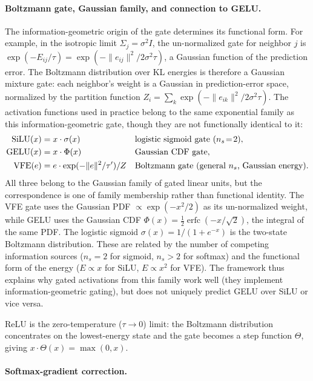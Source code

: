 \documentclass[twoside,11pt]{article}
\begin{document}
\paragraph{Boltzmann gate, Gaussian family, and connection to GELU.}

The information-geometric origin of the gate determines its functional form. For example, in the isotropic limit $\Sigma_j = \sigma^2 I$, the un-normalized gate for neighbor $j$ is $\exp(-E_{ij}/\tau) = \exp(-\|e_{ij}\|^2 / 2\sigma^2\tau)$, a Gaussian function of the prediction error. The Boltzmann distribution over KL energies is therefore a Gaussian mixture gate: each neighbor's weight is a Gaussian in prediction-error space, normalized by the partition function $Z_i = \sum_k \exp(-\|e_{ik}\|^2/2\sigma^2\tau)$. The activation functions used in practice belong to the same exponential family as this information-geometric gate, though they are not functionally identical to it:
%
\begin{align}
\text{SiLU}(x) &= x \cdot \sigma(x) && \text{logistic sigmoid gate ($n_s\!=\!2$)}, \notag \\
\text{GELU}(x) &= x \cdot \Phi(x) && \text{Gaussian CDF gate}, \label{eq:activation_comparison} \\
\text{VFE}(e) &= e \cdot \exp(-\|e\|^2/\tau')/Z && \text{Boltzmann gate (general $n_s$, Gaussian energy)}. \notag
\end{align}
%
All three belong to the Gaussian family of gated linear units, but the correspondence is one of family membership rather than functional identity. The VFE gate uses the Gaussian PDF $\propto \exp(-x^2/2)$ as its un-normalized weight, while GELU uses the Gaussian CDF $\Phi(x) = \frac{1}{2}\operatorname{erfc}(-x/\sqrt{2})$, the integral of the same PDF. The logistic sigmoid $\sigma(x) = 1/(1+e^{-x})$ is the two-state Boltzmann distribution. These are related by the number of competing information sources ($n_s = 2$ for sigmoid, $n_s > 2$ for softmax) and the functional form of the energy ($E \propto x$ for SiLU, $E \propto x^2$ for VFE). The framework thus explains why gated activations from this family work well (they implement information-geometric gating), but does not uniquely predict GELU over SiLU or vice versa.

ReLU is the zero-temperature ($\tau \to 0$) limit: the Boltzmann distribution concentrates on the lowest-energy state and the gate becomes a step function $\Theta$, giving $x \cdot \Theta(x) = \max(0, x)$.

\paragraph{Softmax-gradient correction.}
\end{document}
